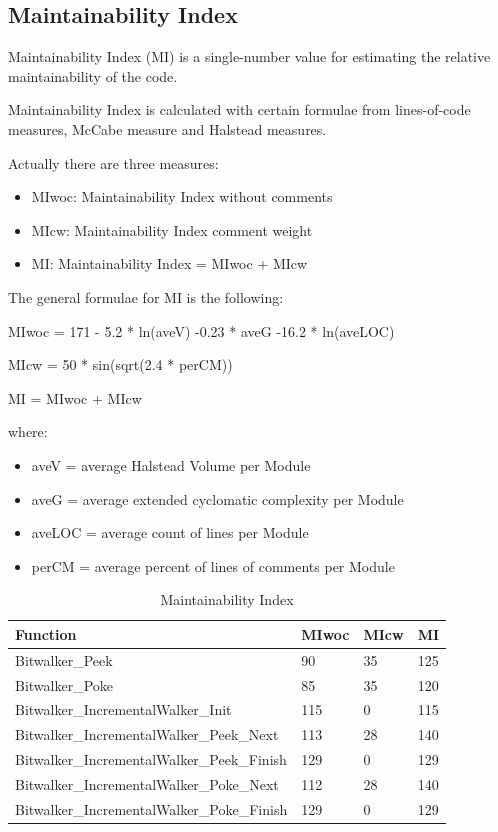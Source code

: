 \subsection{Maintainability Index}
Maintainability Index (MI) is a single-number value for estimating the relative maintainability of the code.

Maintainability Index is calculated with certain formulae from lines-of-code measures, McCabe measure and Halstead measures.

Actually there are three measures:
\begin{itemize}
\item MIwoc: Maintainability Index without comments
\item MIcw: Maintainability Index comment weight
\item MI: Maintainability Index = MIwoc + MIcw
\end{itemize}

The general formulae for MI is the following:

MIwoc = 171 - 5.2 * ln(aveV) -0.23 * aveG -16.2 * ln(aveLOC)

MIcw = 50 * sin(sqrt(2.4 * perCM))

MI = MIwoc + MIcw

where:
\begin{itemize}
\item aveV = average Halstead Volume per Module
\item aveG = average extended cyclomatic complexity per Module
\item aveLOC = average count of lines per Module
\item perCM = average percent of lines of comments per Module
\end{itemize}

\begin{longtable}{||p{}|p{}|p{}|p{}||}
  \caption{Maintainability Index}\\
    \hline\hline
    \textbf{Function} &\textbf{MIwoc} & \textbf{MIcw} & \textbf{MI}\\
    \hline\hline
    \endhead
    \hline\hline
    \endfoot
    Bitwalker\_Peek & 90 & 35 & 125 
    \\
    \hline
    Bitwalker\_Poke & 85 & 35 & 120 
    \\
    \hline
    Bitwalker\_IncrementalWalker\_Init & 115 & 0 & 115  
    \\
    \hline
    Bitwalker\_IncrementalWalker\_Peek\_Next & 113 & 28 & 140  
    \\
    \hline
    Bitwalker\_IncrementalWalker\_Peek\_Finish & 129 & 0 & 129  
    \\
    \hline
    Bitwalker\_IncrementalWalker\_Poke\_Next & 112 & 28 & 140  
    \\
    \hline
    Bitwalker\_IncrementalWalker\_Poke\_Finish & 129 & 0 & 129  
    \\
    \hline
   \end{longtable}

